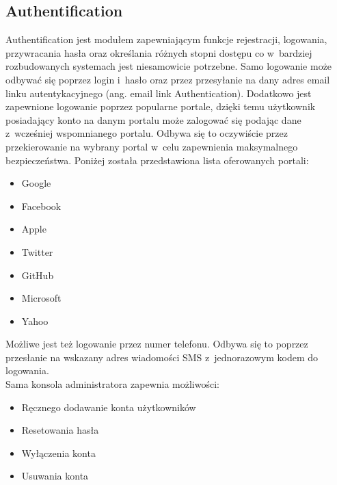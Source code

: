 \documentclass[../Kamil_Kowalewski_Main.tex]{subfiles}
\begin{document}
{{        \subsection{Authentification}
        \label{chapter3:technologie:firebase:auth} {
            Authentification jest modułem zapewniającym funkcje rejestracji, logowania,
            przywracania hasła oraz określania różnych stopni dostępu co w~bardziej
            rozbudowanych systemach jest niesamowicie potrzebne. Samo logowanie może
            odbywać się poprzez login i~hasło oraz przez przesyłanie na dany adres email
            linku autentykacyjnego (ang. email link Authentication). Dodatkowo jest
            zapewnione logowanie poprzez popularne portale, dzięki temu użytkownik
            posiadający konto na danym portalu może zalogować się podając dane
            z~wcześniej wspomnianego portalu. Odbywa się to oczywiście przez
            przekierowanie na wybrany portal w~celu zapewnienia maksymalnego
            bezpieczeństwa. Poniżej została przedstawiona lista oferowanych portali:
            \begin{itemize}
                \item Google
                \item Facebook
                \item Apple
                \item Twitter
                \item GitHub
                \item Microsoft
                \item Yahoo
            \end{itemize}

            Możliwe jest też logowanie przez numer telefonu. Odbywa się to poprzez
            przesłanie na wskazany adres wiadomości SMS z~jednorazowym kodem do
            logowania.\\

            Sama konsola administratora zapewnia możliwości:
            \begin{itemize}
                \item Ręcznego dodawanie konta użytkowników
                \item Resetowania hasła
                \item Wyłączenia konta
                \item Usuwania konta
            \end{itemize}
        }

}}
\end{document}
